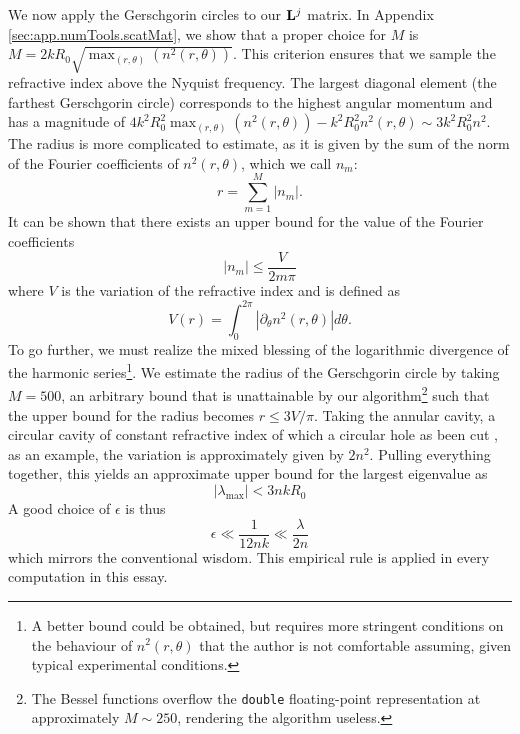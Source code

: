We now apply the Gerschgorin circles to our $\mathbf{L}^j$ matrix. 
In Appendix \ref{sec:app.numTools.scatMat}, we show that a proper choice for $M$
is $M=2kR_0\sqrt{\mathop{\max}_{(r,\theta)}\left(n^2(r,\theta)\right)}$. This criterion
ensures that we sample the refractive index above the Nyquist frequency. The largest
diagonal element (the farthest Gerschgorin circle) corresponds
to the highest angular momentum and has a magnitude of 
$4k^2R_0^2\mathop{\max}_{(r,\theta)}\left(n^2(r,\theta)\right)-k^2R_0^2n^2(r,\theta)\sim3k^2R_0^2n^2$.
The radius is more complicated to estimate, as it is given by the sum of the norm
of the Fourier coefficients of $n^2(r,\theta)$, which we call $n_m$:
  \begin{equation}
   r = \sum_{m=1}^M |n_m|.
  \end{equation}
It can be shown that there exists an upper bound for the value of the
Fourier coefficients \cite{JAC1920}
  \begin{equation}
   |n_m| \leq \frac{V}{2m\pi}
  \end{equation}
where $V$ is the variation of the refractive index and is defined as
  \begin{equation}
   V(r) = \int_0^{2\pi}\left|\partial_\theta n^2(r,\theta)\right|d\theta.
  \end{equation}
To go further, we must realize the mixed blessing of the logarithmic
divergence of the harmonic series\footnote{A better bound could be obtained, but requires more
stringent conditions on the behaviour of $n^2(r,\theta)$ that the author is not comfortable assuming, given
typical experimental conditions.}. We estimate the radius
of the Gerschgorin circle by taking $M=500$, an arbitrary bound
that is unattainable by our algorithm\footnote{The Bessel functions overflow the \texttt{double} floating-point 
representation at approximately $M\sim250$, rendering the algorithm useless.}
such that the upper bound for the radius becomes $r\leq 3V/\pi$. Taking the annular
cavity, a circular cavity of constant refractive index of which a circular hole as been cut \cite{HEN2002b}, as an example, the variation is approximately given by 
$2n^2$. Pulling everything together, this yields an approximate upper
bound for the largest eigenvalue as
  \begin{equation}
   |\lambda_\text{max}| < 3nkR_0
  \end{equation}
A good choice of $\epsilon$ is thus
  \begin{equation}
   \epsilon \ll \frac{1}{12nk} \ll \frac{\lambda}{2n}
  \end{equation}
which mirrors the conventional wisdom. This empirical rule
is applied in every computation in this essay.

